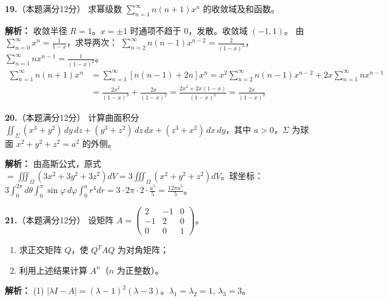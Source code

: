 \vspace{8pt}

\textbf{19.}（本题满分12分）
求幂级数 $\displaystyle\sum_{n=1}^{\infty} n(n+1)x^n$ 的收敛域及和函数。

\ifshowsolutions\par\noindent\textbf{解析：} 收敛半径 $R=1$。$x=\pm1$ 时通项不趋于 $0$，发散。收敛域 $(-1,1)$。
由 $\sum_{n=0}^{\infty}x^n=\frac{1}{1-x}$，求导两次：
$\sum_{n=2}^{\infty}n(n-1)x^{n-2}=\frac{2}{(1-x)^3}$，$\sum_{n=1}^{\infty}nx^{n-1}=\frac{1}{(1-x)^2}$。
\begin{align*}
\sum_{n=1}^{\infty}n(n+1)x^n &= \sum_{n=1}^{\infty}[n(n-1)+2n]x^n = x^2\sum_{n=2}^{\infty}n(n-1)x^{n-2} + 2x\sum_{n=1}^{\infty}nx^{n-1} \\
&= \frac{2x^2}{(1-x)^3} + \frac{2x}{(1-x)^2} = \frac{2x^2+2x(1-x)}{(1-x)^3} = \frac{2x}{(1-x)^3}
\end{align*}
\else \answerarea[8] \fi

\vspace{8pt}

\textbf{20.}（本题满分12分）
计算曲面积分 $\displaystyle\iint_{\Sigma} (x^3+y^2)\,dy\,dz + (y^3+z^2)\,dz\,dx + (z^3+x^2)\,dx\,dy$，其中 $a>0$，$\Sigma$ 为球面 $x^2+y^2+z^2=a^2$ 的外侧。

\ifshowsolutions\par\noindent\textbf{解析：} 由高斯公式，原式 $=\iiint_{\Omega}(3x^2+3y^2+3z^2)dV = 3\iiint_{\Omega}(x^2+y^2+z^2)dV$。球坐标：
$3\int_{0}^{2\pi}d\theta\int_{0}^{\pi}\sin\varphi\,d\varphi\int_{0}^{a}r^4dr = 3\cdot2\pi\cdot2\cdot\frac{a^5}{5} = \frac{12\pi a^5}{5}$。
\else \answerarea[8] \fi

\vspace{8pt}

\textbf{21.}（本题满分12分）
设矩阵 $A = \begin{pmatrix} 2 & -1 & 0 \\ -1 & 2 & 0 \\ 0 & 0 & 1 \end{pmatrix}$。
\begin{enumerate}
    \item[(1)] 求正交矩阵 $Q$，使 $Q^T A Q$ 为对角矩阵；
    \item[(2)] 利用上述结果计算 $A^n$（$n$ 为正整数）。
\end{enumerate}

\ifshowsolutions\par\noindent\textbf{解析：} (1) $|\lambda I-A| = (\lambda-1)^2(\lambda-3)$。$\lambda_1=\lambda_2=1$, $\lambda_3=3$。

